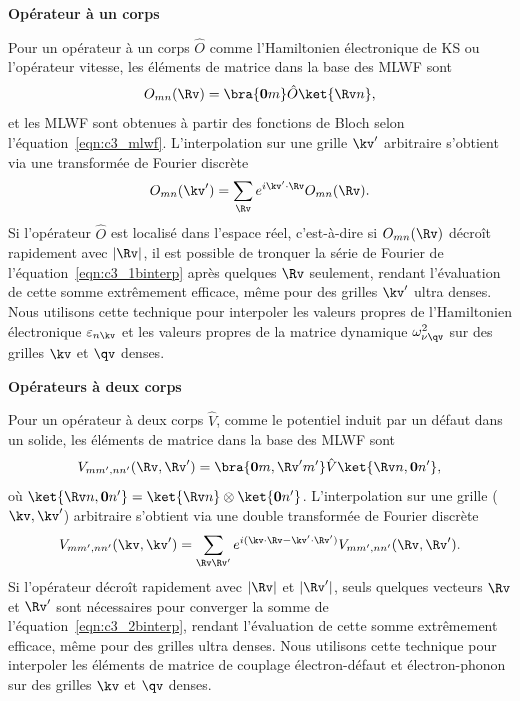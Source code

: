 \noindent\textbf{Opérateur à un corps}

Pour un opérateur à un corps $\hat{O}$ comme l'Hamiltonien électronique de KS ou l'opérateur vitesse, les éléments de matrice dans la base des MLWF sont
\begin{equation}
    O_{mn}(\Rv)=\bra{\mathbf{0}m}\hat{O}\ket{\Rv n},
\end{equation}
et les MLWF sont obtenues à partir des fonctions de Bloch selon l'équation~\eqref{eqn:c3_mlwf}. L'interpolation sur une grille $\kv'$ arbitraire s'obtient via une transformée de Fourier discrète
\begin{equation}
    O_{mn}(\kv') = \sum_{\Rv} e^{i\kv'\cdot\Rv}O_{mn}(\Rv).\label{eqn:c3_1binterp} 
\end{equation}
Si l'opérateur $\hat{O}$ est localisé dans l'espace réel, c'est-à-dire si $O_{mn}(\Rv)$ décroît rapidement avec $|\Rv|$, il est possible de tronquer la série de Fourier de l'équation~\eqref{eqn:c3_1binterp} après quelques $\Rv$ seulement, rendant l'évaluation de cette somme extrêmement efficace, même pour des grilles $\kv'$ ultra denses. Nous utilisons cette technique pour interpoler les valeurs propres de l'Hamiltonien électronique $\varepsilon_{n\kv}$ et les valeurs propres de la matrice dynamique $\omega_{\nu\qv}^2$ sur des grilles $\kv$ et $\qv$ denses.

\noindent\textbf{Opérateurs à deux corps}

Pour un opérateur à deux corps $\hat{V}$, comme le potentiel induit par un défaut dans un solide, les éléments de matrice dans la base des MLWF sont
\begin{equation}
    V_{mm',nn'}(\Rv,\Rv') = \bra{\mathbf{0}m,\Rv'm'}\hat{V}\ket{\Rv n,\mathbf{0}n'},
\end{equation}
où $\ket{\Rv n,\mathbf{0} n'}=\ket{\Rv n}\otimes \ket{\mathbf{0} n'}$. L'interpolation sur une grille ($\kv,\kv'$) arbitraire s'obtient via une double transformée de Fourier discrète
\begin{equation}
    V_{mm',nn'}(\kv,\kv')=\sum_{\Rv\Rv'}e^{i(\kv\cdot\Rv - \kv'\cdot\Rv')}V_{mm',nn'}(\Rv,\Rv').\label{eqn:c3_2binterp}
\end{equation}
Si l'opérateur décroît rapidement avec $|\Rv|$ et $|\Rv'|$, seuls quelques vecteurs $\Rv$ et $\Rv'$ sont nécessaires pour converger la somme de l'équation~\eqref{eqn:c3_2binterp}, rendant l'évaluation de cette somme extrêmement efficace, même pour des grilles ultra denses. Nous utilisons cette technique pour interpoler les éléments de matrice de couplage électron-défaut et électron-phonon sur des grilles $\kv$ et $\qv$ denses. 

